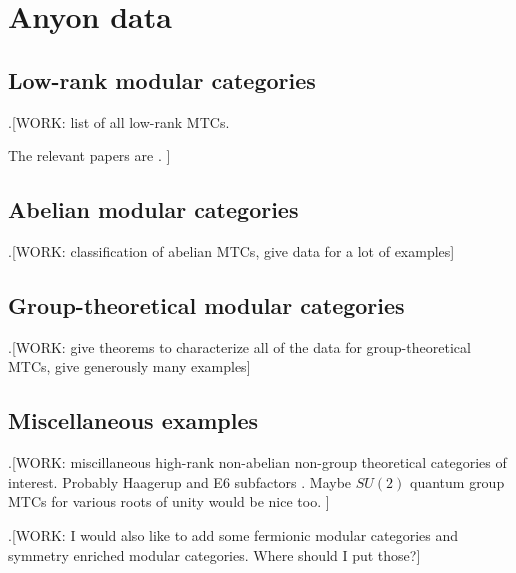 \section{Anyon data}
\label{anyon-data}

\subsection{Low-rank modular categories}

.[WORK: list of all low-rank MTCs.

The relevant papers are \cite{rowell2009classification, bruillard2016classification}.
]

\subsection{Abelian modular categories}

.[WORK: classification of abelian MTCs, give data for a lot of examples]

\subsection{Group-theoretical modular categories}

.[WORK: give theorems to characterize all of the data for group-theoretical MTCs, give generously many examples]

\subsection{Miscellaneous examples}

.[WORK: miscillaneous high-rank non-abelian non-group theoretical categories of interest. Probably Haagerup and E6 subfactors \cite{hong2008exotic}. Maybe $SU(2)$ quantum group MTCs for various roots of unity would be nice too.
]

.[WORK: I would also like to add some fermionic modular categories and symmetry enriched modular categories. Where should I put those?]